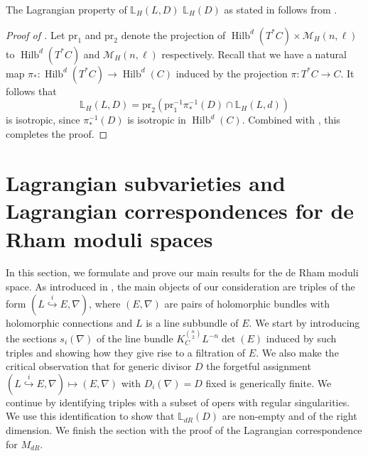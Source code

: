 \documentclass[twoside, 11pt]{article}
\numberwithin{equation}{section}
\theoremstyle{theorem}
\numberwithin{theorem}{section}
\theoremstyle{definition}
\begin{document}
The Lagrangian property of \( \mathbb{L}_{{H}}(L, D)\)  \(\mathbb{L}_{{H}}(D)\) as stated in  follows from .

\begin{proof}[Proof of ]
    Let $\mathrm{pr}_1$ and $\mathrm{pr}_2$ denote the projection of $\operatorname{Hilb}^d(T^\ast C)\times \mathcal{M}_{H}(n, \ell)$ to $\operatorname{Hilb}^d(T^\ast C)$ and $\mathcal{M}_{H}(n, \ell)$ respectively.
    Recall that we have a natural map $\pi_\ast: \operatorname{Hilb}^d(T^\ast C) \to \operatorname{Hilb}^d(C)$  induced by the projection $\pi:T^\ast C\to C$. 
    It follows that 
    $$\mathbb{L}_H(L,D) = \mathrm{pr}_2 \left( \mathrm{pr}_1^{-1}\pi_\ast^{-1}(D) \cap \mathbb{L}_H(L,d) \right)$$ 
    is isotropic, since $\pi_\ast^{-1}(D)$ is isotropic in  $\operatorname{Hilb}^d(C)$. Combined with , this completes the proof.
\end{proof}




\section{Lagrangian subvarieties and Lagrangian correspondences for de Rham moduli spaces}\label{LDR}

In this section, we formulate and prove our main results for the de Rham moduli space. As introduced in , the main objects of our consideration are triples of the form $(L \overset{i}{\hookrightarrow} E, \nabla)$, where $(E, \nabla)$ are pairs of holomorphic bundles with holomorphic connections and $L$ is a line subbundle of $E$. 
We start by introducing the sections $s_i(\nabla)$ of the line bundle $K_C^{n \choose 2} L^{-n} \det(E)$ induced by such triples and showing how they give rise to a filtration of $E$. We also make the critical observation that for generic divisor $D$ the forgetful assignment $(L \overset{i}{\hookrightarrow} E, \nabla) \mapsto (E, \nabla)$ with $D_i(\nabla)=D$ fixed is generically finite. 
We continue by identifying triples with a subset of opers with regular singularities. We use this identification to show that $\mathbb L_{dR}(D)$ are non-empty and of the right dimension. We finish the section with the proof of the Lagrangian correspondence for $M_{dR}$. 
\smallskip
\end{document}
